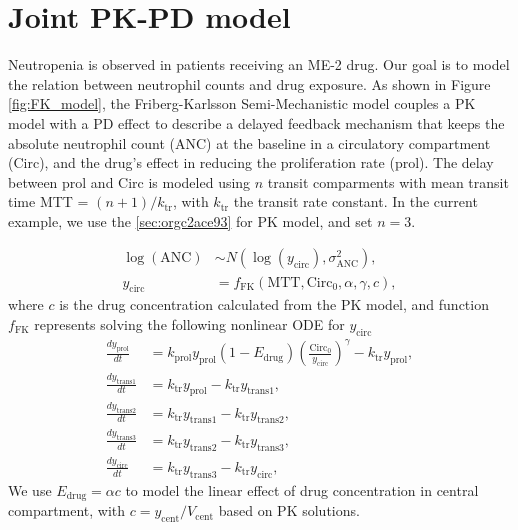 \documentclass[12pt, reqno, oneside]{amsbook}
\numberwithin{equation}{chapter}
\numberwithin{figure}{chapter}
\numberwithin{table}{chapter}
\theoremstyle{remark}
\begin{document}
\section{Joint PK-PD model}
\label{sec:fk_model}
Neutropenia is observed in patients receiving an ME-2 drug. Our goal
is to model the relation between neutrophil counts and drug
exposure. As shown in Figure \ref{fig:FK_model}, the Friberg-Karlsson Semi-Mechanistic model \cite{friberg_mechanistic_2003} couples
a PK model with a PD
effect to describe a delayed feedback mechanism that keeps the
absolute neutrophil count (ANC) at the
baseline in a circulatory compartment (Circ), and
the drug's effect in
reducing the proliferation rate (prol).
The delay between prol and Circ is modeled using \(n\) transit
comparments with mean transit time MTT = \((n + 1)/k_{\text{tr}}\),
with \(k_{\text{tr}}\) the transit rate constant. In the current
example, we use the \ref{sec:orgc2ace93} for
PK model, and set \(n = 3\).

\begin{align}
  \log(\text{ANC})& \sim N(\log(y_{\text{circ}}), \sigma^2_{\text{ANC}}),  \\
  y_{\text{circ}}& = f_{\text{FK}}(\text{MTT}, \text{Circ}_{0}, \alpha, \gamma, c),
\end{align}
  where \(c\) is the drug concentration calculated from the PK model, and function \(f_{\text{FK}}\) represents solving the following
nonlinear ODE for \(y_{\text{circ}}\)
\begin{align}\label{eq:FK}
  \frac{dy_\mathrm{prol}}{dt} &= k_\mathrm{prol} y_\mathrm{prol} (1 - E_\mathrm{drug})\left(\frac{\text{Circ}_0}{y_\mathrm{circ}}\right)^\gamma - k_\mathrm{tr}y_\mathrm{prol}, \\
  \frac{dy_\mathrm{trans1}}{dt} &= k_\mathrm{tr} y_\mathrm{prol} - k_\mathrm{tr} y_\mathrm{trans1}, \\
  \frac{dy_\mathrm{trans2}}{dt} &= k_\mathrm{tr} y_\mathrm{trans1} - k_\mathrm{tr} y_\mathrm{trans2},  \\
  \frac{dy_\mathrm{trans3}}{dt} &= k_\mathrm{tr} y_\mathrm{trans2} - k_\mathrm{tr} y_\mathrm{trans3},  \\
  \frac{dy_\mathrm{circ}}{dt} &= k_\mathrm{tr} y_\mathrm{trans3} - k_\mathrm{tr} y_\mathrm{circ},
\end{align}
We use \(E_{\text{drug}} = \alpha c\) to model the linear effect of drug
concentration in central compartment, with
\(c=y_{\text{cent}}/V_{\text{cent}}\) based on PK solutions.
\end{document}
